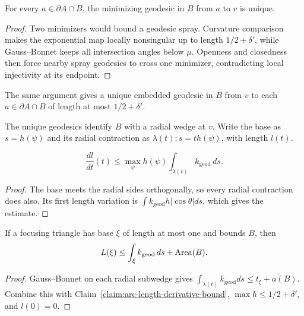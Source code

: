 \begin{claim}
\label{claim:focusing-triangle-vertex-geodesic-unique}
For every $a\in\partial A\cap B$, the minimizing geodesic in $B$ from $a$ to
$v$ is unique.
\end{claim}
\begin{proof}
\sketch Two minimizers would bound a geodesic spray. Curvature comparison makes
the exponential map locally nonsingular up to length $1/2+\delta'$, while
Gauss--Bonnet keeps all intersection angles below $\mu$. Openness and closedness
then force nearby spray geodesics to cross one minimizer, contradicting local
injectivity at its endpoint.
\end{proof}

\begin{remark}
\label{rem:focusing-triangle-vertex-geodesic-embedded}
The same argument gives a unique embedded geodesic in $B$ from $v$ to each
$a\in\partial A\cap B$ of length at most $1/2+\delta'$.
\end{remark}

The unique geodesics identify $B$ with a radial wedge at $v$. Write the base as
$s=h(\psi)$ and its radial contraction as $\lambda(t):s=th(\psi)$, with length
$l(t)$.

\begin{claim}
\label{claim:arc-length-derivative-bound}
\[
\frac{dl}{dt}(t)\le\max_\psi h(\psi)
\int_{\lambda(t)}k_{\mathrm{geod}}\,ds.
\]
\end{claim}
\begin{proof}
\sketch The base meets the radial sides orthogonally, so every radial
contraction does also. Its first length variation is
$\int k_{\mathrm{geod}}h|\cos\theta|ds$, which gives the estimate.
\end{proof}

\begin{lemma}
\label{lem:focusing-triangle-base-length-bound}
\label{laest}
If a focusing triangle has base $\xi$ of length at most one and bounds $B$,
then
\[
L(\xi)\le\int_\xi k_{\mathrm{geod}}\,ds+\operatorname{Area}(B).
\]
\end{lemma}
\begin{proof}
\sketch Gauss--Bonnet on each radial subwedge gives
$\int_{\lambda(t)}k_{\mathrm{geod}}ds\le t_\xi+a(B)$. Combine this with
Claim~\ref{claim:arc-length-derivative-bound},
$\max h\le1/2+\delta'$, and $l(0)=0$.
\end{proof}

